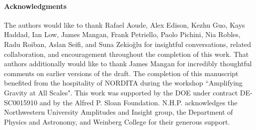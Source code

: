 \documentclass[11pt,letter]{article}
\begin{document}
\paragraph{Acknowledgments} The authors would like to thank Rafael Aoude, Alex Edison, Kezhu Guo, Kays Haddad, Ian Low, James Mangan, Frank Petriello, Paolo Pichini, Nia Robles, Radu Roiban, Aslan Seifi, and Suna Zekio\u{g}lu for insightful conversations, related collaboration, and encouragement throughout the completion of this work. That authors additionally would like to thank James Mangan for incredibly thoughtful comments on earlier versions of the draft. The completion of this manuscript benefited from the hospitality of NORDITA during the workshop ``Amplifying Gravity
at All Scales". This work was supported by the DOE under contract DE-SC0015910 and by the Alfred P. Sloan Foundation. N.H.P. acknowledges the Northwestern University Amplitudes and Insight group, the Department of Physics and Astronomy, and Weinberg College for their generous support. 



\end{document}
